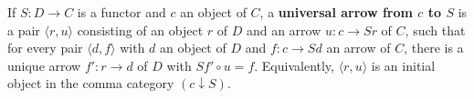 If $S: D \to C$ is a functor and $c$ an object of $C$, a \textbf{universal arrow from $c$ to $S$} is a pair $\langle r, u \rangle$ consisting of an object $r$ of $D$ and an arrow $u: c \to Sr$ of $C$, such that for every pair $\langle d, f \rangle$ with $d$ an object of $D$ and $f: c \to Sd$ an arrow of $C$, there is a unique arrow $f': r \to d$ of $D$ with $Sf' \circ u = f$. Equivalently, $\langle r, u \rangle$ is an initial object in the comma category $(c \downarrow S)$.